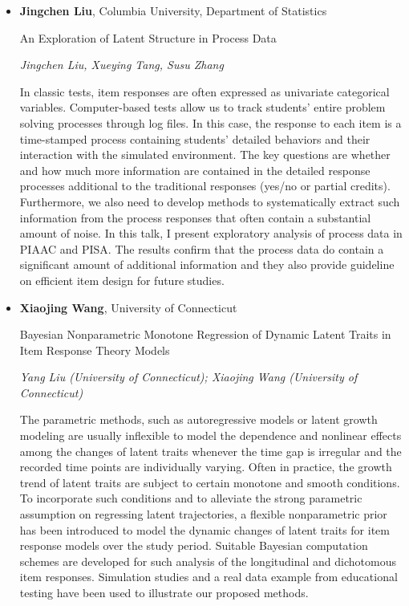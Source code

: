 \begin{itemize}
\item \textbf{Jingchen Liu}, Columbia University, Department of Statistics

An Exploration of Latent Structure in Process Data

\emph{\footnotesize Jingchen Liu, Xueying Tang, Susu Zhang}

In classic tests, item responses are often expressed as univariate categorical variables. Computer-based tests allow us to track students’ entire problem solving processes through log files. In this case, the response to each item is a time-stamped process containing students’ detailed behaviors and their interaction with the simulated environment. The key questions are whether and how much more information are contained in the detailed response processes additional to the traditional responses (yes/no or partial credits). Furthermore, we also need to develop methods to systematically extract such information from the process responses that often contain a substantial amount of noise. In this talk, I present exploratory analysis of process data in PIAAC and PISA. The results confirm that the process data do contain a significant amount of additional information and they also provide guideline on efficient item design for future studies.

\item \textbf{Xiaojing Wang}, University of Connecticut

Bayesian Nonparametric Monotone Regression of Dynamic Latent Traits in Item Response Theory Models

\emph{\footnotesize Yang Liu (University of Connecticut); Xiaojing Wang (University of Connecticut)}

The parametric methods, such as autoregressive models or latent growth modeling are usually inflexible to model the dependence and nonlinear effects among the changes of latent traits whenever the time gap is irregular and the recorded time points are individually varying. Often in practice, the growth trend of latent traits are subject to certain monotone and smooth conditions. To incorporate such conditions and to alleviate the strong parametric assumption on regressing latent trajectories, a flexible nonparametric prior has been introduced to model the dynamic changes of latent traits for item response models over the study period. Suitable Bayesian computation schemes are developed for such analysis of the longitudinal and dichotomous item responses. Simulation studies and a real data example from educational testing have been used to illustrate our proposed methods.

\end{itemize}

